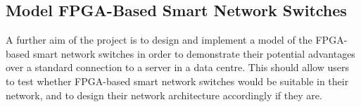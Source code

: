 \subsection{Model FPGA-Based Smart Network Switches}
A further aim of the project is to design and implement a model of the FPGA-based smart network switches in order to demonstrate their potential advantages over a standard connection to a server in a data centre. This should allow users to test whether FPGA-based smart network switches would be suitable in their network, and to design their network architecture accordingly if they are. 
